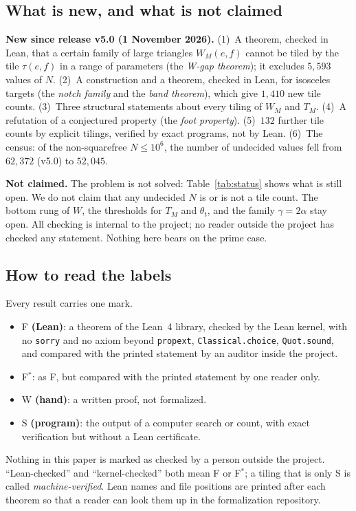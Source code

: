 \documentclass[11pt,reqno]{amsart}
\theoremstyle{plain}
\theoremstyle{definition}
\newcommand{\sF}{\textup{\textsf{F}}}
\newcommand{\sW}{\textup{\textsf{W}}}
\newcommand{\sS}{\textup{\textsf{S}}}
\begin{document}
\subsection{What is new, and what is not claimed}\label{sub:intro:new}
\textbf{New since release v5.0 (1 November 2026).}
(1)~A theorem, checked in Lean, that a certain family of large triangles $W_M(e,f)$ cannot be tiled by the tile
$\tau(e,f)$ in a range of parameters (the \emph{W-gap theorem}); it excludes $5{,}593$ values of $N$.
(2)~A construction and a theorem, checked in Lean, for isosceles targets (the \emph{notch family} and the \emph{band theorem}),
which give $1{,}410$ new tile counts. (3)~Three structural statements about every tiling of $W_M$ and $T_M$.
(4)~A refutation of a conjectured property (the \emph{foot property}). (5)~$132$ further tile counts by explicit tilings,
verified by exact programs, not by Lean. (6)~The census: of the non-squarefree $N\le10^6$, the number of undecided
values fell from $62{,}372$ (v5.0) to $52{,}045$.

\textbf{Not claimed.} The problem is not solved: Table~\ref{tab:status} shows what is still open. We do not claim that any
undecided $N$ is or is not a tile count. The bottom rung of $W$, the thresholds for $T_M$ and $\theta_t$, and the
family $\gamma=2\alpha$ stay open. All checking is internal to the project; no reader outside the project has checked any
statement. Nothing here bears on the prime case.

\subsection{How to read the labels}\label{sub:intro:labels}
Every result carries one mark.
\begin{itemize}\setlength{\itemsep}{0pt}
\item \sF{} \textbf{(Lean)}: a theorem of the Lean~4 library, checked by the Lean kernel, with no \texttt{sorry} and no axiom
beyond \texttt{propext}, \texttt{Classical.choice}, \texttt{Quot.sound}, and compared with the printed statement by an
auditor inside the project.
\item \sF$^\ast$: as \sF{}, but compared with the printed statement by one reader only.
\item \sW{} \textbf{(hand)}: a written proof, not formalized.
\item \sS{} \textbf{(program)}: the output of a computer search or count, with exact verification but without a Lean
certificate.
\end{itemize}
Nothing in this paper is marked as checked by a person outside the project. ``Lean-checked'' and ``kernel-checked'' both mean
\sF{} or \sF$^\ast$; a tiling that is only \sS{} is called \emph{machine-verified}. Lean names and file positions are
printed after each theorem so that a reader can look them up in the formalization repository.
\end{document}
